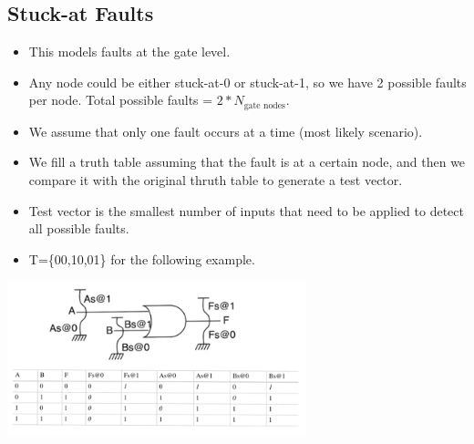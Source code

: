 \documentclass[11pt]{article}
\begin{document}
\subsection*{Stuck-at Faults}
\begin{itemize}
    \item This models faults at the gate level.
    \item Any node could be either stuck-at-0 or stuck-at-1, so we have 2 possible faults per node. Total possible faults = $2*{N_{\text{gate nodes}}}$.
    \item We assume that only one fault occurs at a time (most likely scenario).
    \item We fill a truth table assuming that the fault is at a certain node, and then we compare it with the original thruth table to generate a test vector.
    \item Test vector is the smallest number of inputs that need to be applied to detect all possible faults.
    \item T=\{00,10,01\} for the following example.
\end{itemize}
\begin{center}
    \includegraphics[width=0.65\textwidth]{3.png}
\end{center}
\end{document}
